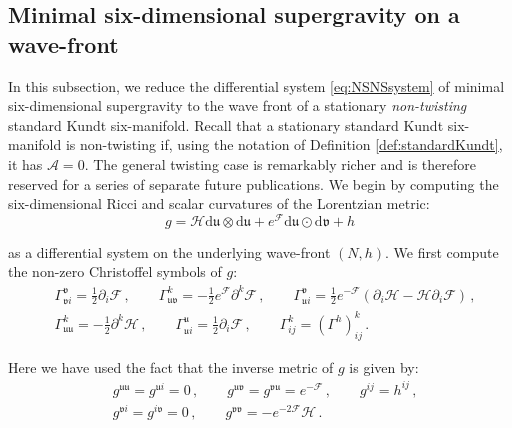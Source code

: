 \documentclass[10pt,a4paper,twoside,reqno]{amsart}
\theoremstyle{plain}
\theoremstyle{definition}
\theoremstyle{remark}
\def\dd{\mathrm{d}}
\def\cH{\mathcal{H}}
\def\cA{\mathcal{A}}
\def\cF{\mathcal{F}}
\def\cH{\mathcal{H}}
\def\dd{\mathrm{d}}
\begin{document}

\subsection{Minimal six-dimensional supergravity on a wave-front}


In this subsection, we reduce the differential system \eqref{eq:NSNSsystem} of minimal six-dimensional supergravity to the wave front of a stationary \emph{non-twisting} standard Kundt six-manifold. Recall that a stationary standard Kundt six-manifold is non-twisting if, using the notation of Definition \ref{def:standardKundt}, it has $\cA = 0$. The general twisting case is remarkably richer and is therefore reserved for a series of separate future publications. We begin by computing the six-dimensional Ricci and scalar curvatures of the Lorentzian metric: 
\begin{equation}
\label{eq:nontwistingmetric}
    g = \cH  \dd \mathfrak{u} \otimes \dd \mathfrak{u} +  e^{\cF} \dd \mathfrak{u} \odot \dd \mathfrak{v}  + h 
\end{equation}

\noindent
as a differential system on the underlying wave-front $(N,h)$. We first compute the non-zero Christoffel symbols of $g$:
\begin{eqnarray*}
& \Gamma^{\mathfrak{v}}_{\mathfrak{v}i}  = \frac{1}{2} \partial_i \cF \, , \qquad \Gamma^k_{\mathfrak{u}\mathfrak{v}} = -\frac{1}{2} e^{\cF} \partial^k \cF  \, , \qquad  \Gamma^{\mathfrak{v}}_{\mathfrak{u}i}  = \frac{1}{2} e^{-\cF} ( \partial_i \cH -  \cH  \partial_i \cF )\, ,\\
& \Gamma^k_{\mathfrak{u}\mathfrak{u}} =  - \frac{1}{2} \partial^k \cH  \, , \qquad \Gamma^{\mathfrak{u}}_{\mathfrak{u}i}  = \frac{1}{2} \partial_i \cF \, , \qquad  \Gamma^k_{ij}  =  (\Gamma^h)^k_{ij}\, .
\end{eqnarray*}
 
Here we have used the fact that the inverse metric of $g$ is given by: 
\begin{eqnarray*}
& g^{\mathfrak{u}\mathfrak{u}} = g^{\mathfrak{u}i} = 0 \, , \qquad g^{\mathfrak{u}\mathfrak{v}} = g^{\mathfrak{v}\mathfrak{u}} = e^{-\cF} \, , \qquad g^{ij} = h^{ij}\, ,\\
& g^{\mathfrak{v}i} = g^{i\mathfrak{v}} = 0 \, , \qquad g^{\mathfrak{v}\mathfrak{v}} = -e^{-2\cF} \cH\, .
\end{eqnarray*}
\end{document}
